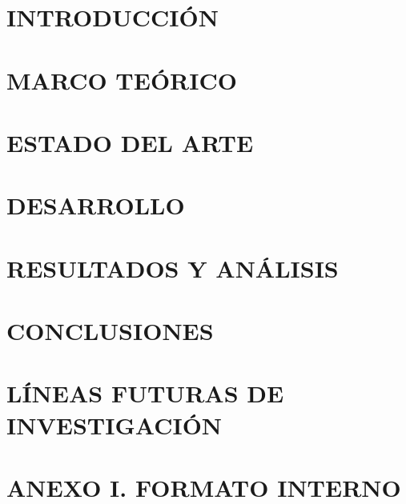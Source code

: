 \documentclass[12pt]{article}
\begin{document}
\clearpage %
\section{INTRODUCCIÓN} 



\clearpage



\newpage
\section{MARCO TEÓRICO} 
    

\newpage
\section{ESTADO DEL ARTE} 
    

\newpage
\section{DESARROLLO} 
    

\newpage
\section{RESULTADOS Y ANÁLISIS} 
    


\newpage
\section{CONCLUSIONES} 
    

\newpage
\section{LÍNEAS FUTURAS DE INVESTIGACIÓN} 
    

\newpage

\printbibliography[title={BIBLIOGRAFÍA}, heading=bibintoc]

\newpage
\appendix
\section*{ANEXO I. \quad FORMATO INTERNO} 
    
\end{document}
